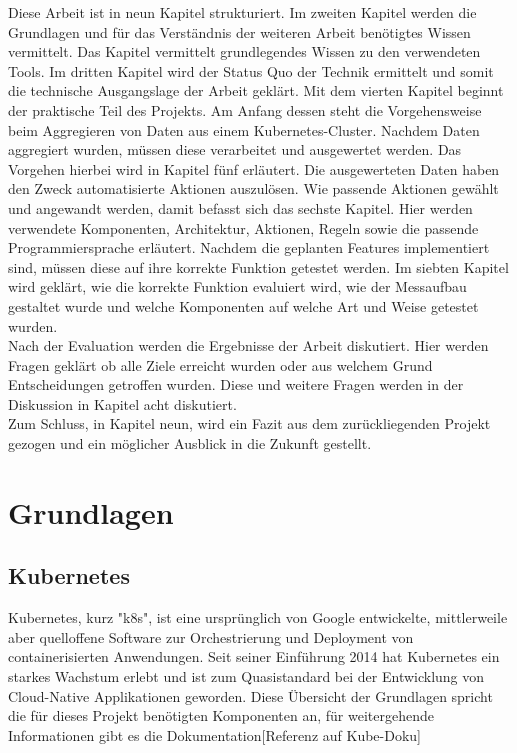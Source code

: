 \documentclass[a4paper,12pt]{scrartcl}
\begin{document}
Diese Arbeit ist in neun Kapitel strukturiert. Im zweiten Kapitel werden die Grundlagen und für das Verständnis der weiteren Arbeit benötigtes Wissen vermittelt. Das Kapitel vermittelt grundlegendes Wissen zu den verwendeten Tools. Im dritten Kapitel wird der Status Quo der Technik ermittelt und somit die technische Ausgangslage der Arbeit geklärt. Mit dem vierten Kapitel beginnt der praktische Teil des Projekts. Am Anfang dessen steht die Vorgehensweise beim Aggregieren von Daten aus einem Kubernetes-Cluster. Nachdem Daten aggregiert wurden, müssen diese verarbeitet und ausgewertet werden. Das Vorgehen hierbei wird in Kapitel fünf erläutert. Die ausgewerteten Daten haben den Zweck automatisierte Aktionen auszulösen. Wie passende Aktionen gewählt und angewandt werden, damit befasst sich das sechste Kapitel.
Hier werden verwendete Komponenten, Architektur, Aktionen, Regeln sowie die passende Programmiersprache erläutert. Nachdem die geplanten Features implementiert sind, müssen diese auf ihre korrekte Funktion getestet werden. Im siebten Kapitel wird geklärt, wie die korrekte Funktion evaluiert wird, wie der Messaufbau gestaltet wurde und welche Komponenten auf welche Art und Weise getestet wurden.\\
Nach der Evaluation werden die Ergebnisse der Arbeit diskutiert. Hier werden Fragen geklärt  ob alle Ziele erreicht wurden oder aus welchem Grund Entscheidungen getroffen wurden. Diese und weitere Fragen werden in der Diskussion in Kapitel acht diskutiert.\\
Zum Schluss, in Kapitel neun, wird ein Fazit aus dem zurückliegenden Projekt gezogen und ein möglicher Ausblick in die Zukunft gestellt.

\pagebreak

\section{Grundlagen}
\subsection{Kubernetes}

Kubernetes, kurz "k8s", ist eine ursprünglich von Google entwickelte, mittlerweile aber quelloffene Software zur Orchestrierung und Deployment von containerisierten Anwendungen. Seit seiner Einführung 2014 hat Kubernetes ein starkes Wachstum erlebt und ist zum Quasistandard bei der Entwicklung von Cloud-Native Applikationen geworden.
Diese Übersicht der Grundlagen spricht die für dieses Projekt benötigten Komponenten an, für weitergehende Informationen gibt es die Dokumentation[Referenz auf Kube-Doku]\\
\end{document}
